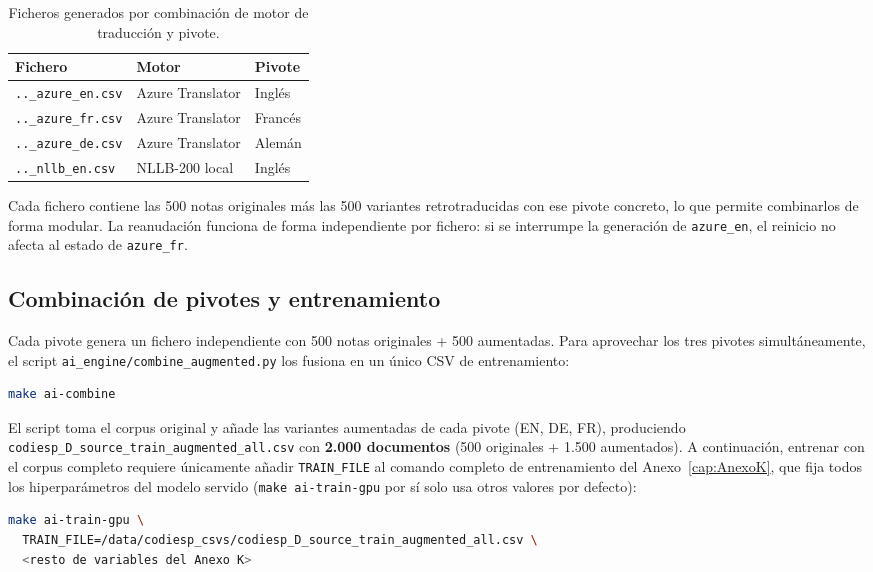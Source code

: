 \begin{table}[h]
\centering
\small
\caption{Ficheros generados por combinación de motor de traducción y pivote.}
\label{tab:augment-files}
\begin{tabular}{lll}
\hline
\textbf{Fichero} & \textbf{Motor} & \textbf{Pivote} \\
\hline
\texttt{..\_azure\_en.csv} & Azure Translator & Inglés \\
\texttt{..\_azure\_fr.csv} & Azure Translator & Francés \\
\texttt{..\_azure\_de.csv} & Azure Translator & Alemán \\
\texttt{..\_nllb\_en.csv}  & NLLB-200 local   & Inglés \\
\hline
\end{tabular}
\end{table}

Cada fichero contiene las 500 notas originales más las 500 variantes retrotraducidas con ese pivote concreto, lo que permite combinarlos de forma modular. La reanudación funciona de forma independiente por fichero: si se interrumpe la generación de \texttt{azure\_en}, el reinicio no afecta al estado de \texttt{azure\_fr}.

\subsection{Combinación de pivotes y entrenamiento}

Cada pivote genera un fichero independiente con 500 notas originales + 500 aumentadas. Para aprovechar los tres pivotes simultáneamente, el script \texttt{ai\_engine/combine\_augmented.py} los fusiona en un único CSV de entrenamiento:

\begin{lstlisting}[language=bash]
make ai-combine
\end{lstlisting}

El script toma el corpus original y añade las variantes aumentadas de cada pivote (EN, DE, FR), produciendo \texttt{codiesp\_D\_source\_train\_augmented\_all.csv} con \textbf{2.000 documentos} (500 originales + 1.500 aumentados). A continuación, entrenar con el corpus completo requiere únicamente añadir \texttt{TRAIN\_FILE} al comando completo de entrenamiento del Anexo~\ref{cap:AnexoK}, que fija todos los hiperparámetros del modelo servido (\texttt{make ai-train-gpu} por sí solo usa otros valores por defecto):

\begin{lstlisting}[language=bash, breaklines=true, breakatwhitespace=false]
make ai-train-gpu \
  TRAIN_FILE=/data/codiesp_csvs/codiesp_D_source_train_augmented_all.csv \
  <resto de variables del Anexo K>
\end{lstlisting}

